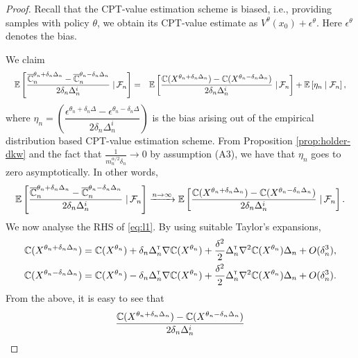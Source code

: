\begin{proof}
Recall that the CPT-value estimation scheme is biased, i.e., providing samples with policy $\theta$, we obtain its CPT-value estimate as $V^{\theta}(x_0) + \epsilon^\theta$. Here $\epsilon^\theta$ denotes the bias. 

We claim
\begin{align}
\quad\mathbb{E}\left[\dfrac{\overline {\mathbb{C}}_n^{\theta_n+\delta_n \Delta_n} -\overline {\mathbb{C}}_n^{\theta_n-\delta_n \Delta_n}}{2 \delta_n \Delta_n^{i}} \left.\right| \mathcal{F}_n\right] 
= \quad&\mathbb{E}\left[\dfrac{\mathbb{C}(X^{\theta_n + \delta_n \Delta_n}) - \mathbb{C}(X^{\theta_n - \delta_n \Delta_n})}{2 \delta_n \Delta_n^{i}} \left.\right| \mathcal{F}_n\right] + \mathbb{E}\left[ \eta_n \mid \mathcal{F}_n\right],
\end{align}
where $\eta_n = \left(\dfrac{\epsilon^{\theta_n +\delta_n\Delta} - \epsilon^{\theta_n-\delta_n\Delta}}{2\delta_n\Delta_n^{i}}\right)$
 is the bias arising out of the empirical distribution based CPT-value estimation scheme.
From Proposition \ref{prop:holder-dkw} and the fact that $\frac{1}{m_n^{\alpha/2} \delta_n} \rightarrow 0$ by assumption (A3), we have that
$\eta_n$ goes to zero asymptotically. In other words,
\begin{align}
\quad\mathbb{E}\left[\dfrac{\overline {\mathbb{C}}_n^{\theta_n+\delta_n \Delta_n} -\overline {\mathbb{C}}_n^{\theta_n-\delta_n \Delta_n}}{2 \delta_n \Delta_n^{i}} \left.\right| \mathcal{F}_n\right] 
&\xrightarrow{n\rightarrow\infty}  \mathbb{E}\left[\dfrac{\mathbb{C}(X^{\theta_n + \delta_n \Delta_n}) -\mathbb{C}(X^{\theta_n - \delta_n \Delta_n})}{2 \delta_n \Delta_n^{i}} \left.\right| \mathcal{F}_n\right].  \label{eq:l1}
\end{align}
We now analyse the RHS of \eqref{eq:l1}.
By using suitable Taylor's expansions,
\begin{align*}
\mathbb{C}(X^{\theta_n + \delta_n \Delta_n}) = \mathbb{C}(X^{\theta_n}) + \delta_n \Delta_n^\mathsf{\scriptscriptstyle T} \nabla \mathbb{C}(X^{\theta_n}) + \frac{\delta^2}{2} \Delta_n^\mathsf{\scriptscriptstyle T} \nabla^2 \mathbb{C}(X^{\theta_n})\Delta_n + O(\delta_n^3), \\
\mathbb{C}(X^{\theta_n - \delta_n \Delta_n}) = \mathbb{C}(X^{\theta_n}) - \delta_n \Delta_n^\mathsf{\scriptscriptstyle T} \nabla \mathbb{C}(X^{\theta_n}) + \frac{\delta^2}{2} \Delta_n^\mathsf{\scriptscriptstyle T} \nabla^2 \mathbb{C}(X^{\theta_n})\Delta_n + O(\delta_n^3).\end{align*}
From the above, it is easy to see that 
\begin{align*}
\dfrac{\C(X^{\theta_n + \delta_n \Delta_n}) - \C(X^{\theta_n - \delta_n \Delta_n})}{2 \delta_n \Delta_n^i}

\end{align*}
\end{proof}
